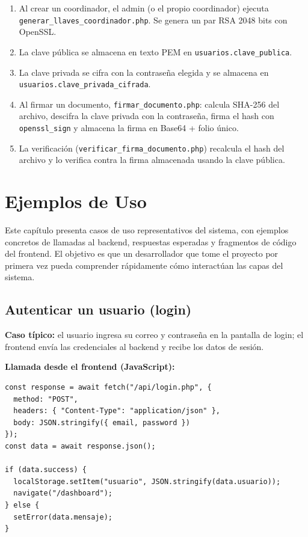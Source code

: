 \documentclass[10pt,letterpaper]{report}
\begin{document}
\begin{enumerate}[label=\arabic*.]
  \item Al crear un coordinador, el admin (o el propio coordinador) ejecuta \texttt{generar\_llaves\_coordinador.php}. Se genera un par RSA 2048 bits con OpenSSL.
  \item La clave pública se almacena en texto PEM en \texttt{usuarios.clave\_publica}.
  \item La clave privada se cifra con la contraseña elegida y se almacena en \texttt{usuarios.clave\_privada\_cifrada}.
  \item Al firmar un documento, \texttt{firmar\_documento.php}: calcula SHA-256 del archivo, descifra la clave privada con la contraseña, firma el hash con \texttt{openssl\_sign} y almacena la firma en Base64 + folio único.
  \item La verificación (\texttt{verificar\_firma\_documento.php}) recalcula el hash del archivo y lo verifica contra la firma almacenada usando la clave pública.
\end{enumerate}

\chapter{Ejemplos de Uso}

Este capítulo presenta casos de uso representativos del sistema, con ejemplos concretos de llamadas al backend, respuestas esperadas y fragmentos de código del frontend. El objetivo es que un desarrollador que tome el proyecto por primera vez pueda comprender rápidamente cómo interactúan las capas del sistema.

\section{Autenticar un usuario (login)}

\textbf{Caso típico:} el usuario ingresa su correo y contraseña en la pantalla de login; el frontend envía las credenciales al backend y recibe los datos de sesión.

\textbf{Llamada desde el frontend (JavaScript):}

\begin{lstlisting}[style=jsstyle, caption={Llamada a login.php desde Login.jsx (elaboración propia).}]
const response = await fetch("/api/login.php", {
  method: "POST",
  headers: { "Content-Type": "application/json" },
  body: JSON.stringify({ email, password })
});
const data = await response.json();

if (data.success) {
  localStorage.setItem("usuario", JSON.stringify(data.usuario));
  navigate("/dashboard");
} else {
  setError(data.mensaje);
}
\end{lstlisting}
\end{document}

